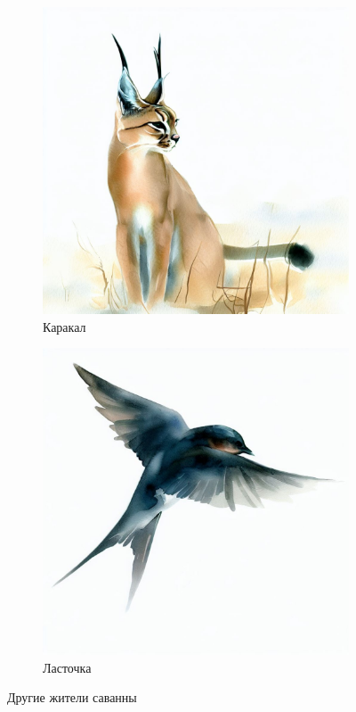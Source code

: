 \documentclass[a5paper,11pt]{memoir}
\begin{document}
\begin{figure}[t]
	\begin{subfigure}{.5\paperwidth}
		\centering
		\includegraphics[width=\linewidth]{images/caracal}
		\caption{Каракал}
	\end{subfigure}
	\begin{subfigure}{.5\paperwidth}
	\centering
	\includegraphics[width=\linewidth]{images/swallow}
	\caption{Ласточка}
\end{subfigure}
	\caption{Другие жители саванны}
\end{figure}
\end{document}
